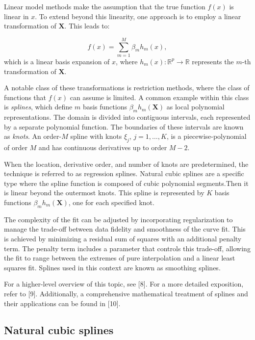 \documentclass[
11pt, %
oneside, %
english, %
singlespacing, %
]{macthesis} %
\begin{document}
Linear model methods make the assumption that the true function \(f(x)\) is linear in \(x\). To extend beyond this linearity, one approach is to employ a linear transformation of \(\mathbf{X}\). This leads to:

\[
f(x) = \sum_{m=1}^{M}\beta_m h_m(x),
\]
which is a linear basis expansion of \(x\),
where \(h_m(x): \mathbb{R}^{p} \to \mathbb{R}\) represents the \(m\)-th transformation of \(\mathbf{X}\).

A notable class of these transformations is restriction methods, where the class of functions that \(f(x)\) can assume is limited. A common example within this class is \emph{splines}, which define \(m\) basis functions \(\beta_m h_m(\mathbf{X})\) as local polynomial representations. The domain is divided into contiguous intervals, each represented by a separate polynomial function. The boundaries of these intervals are known as \emph{knots}. An order-\(M\) spline with knots \(\xi_j\), \(j = 1,\dots, K\), is a piecewise-polynomial of order \(M\) and has continuous derivatives up to order \(M-2\).

When the location, derivative order, and number of knots are predetermined, the technique is referred to as regression splines. Natural cubic splines are a specific type where the spline function is composed of cubic polynomial segments.Then it is linear beyond the outermost knots. This spline is represented by \(K\) basis functions \(\beta_m h_m(\mathbf{X})\), one for each specified knot.

The complexity of the fit can be adjusted by incorporating regularization to manage the trade-off between data fidelity and smoothness of the curve fit. This is achieved by minimizing a residual sum of squares with an additional penalty term. The penalty term includes a parameter that controls this trade-off, allowing the fit to range between the extremes of pure interpolation and a linear least squares fit. Splines used in this context are known as smoothing splines.

For a higher-level overview of this topic, see {[}8{]}. For a more detailed exposition, refer to {[}9{]}. Additionally, a comprehensive mathematical treatment of splines and their applications can be found in {[}10{]}.

\subsection{Natural cubic splines}\label{Natural-cubic-splines}
\end{document}

